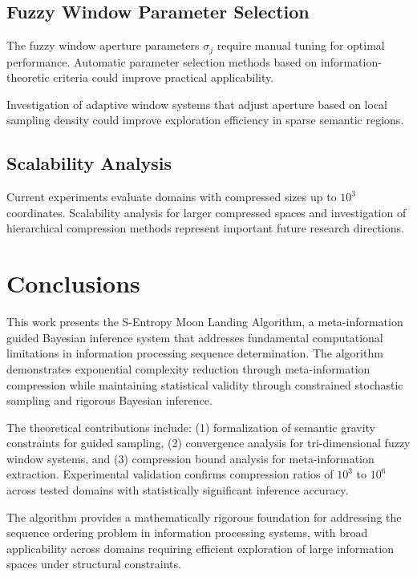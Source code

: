 \documentclass[12pt,a4paper]{article}
\begin{document}
\begin{table}[h]
\subsection{Fuzzy Window Parameter Selection}

The fuzzy window aperture parameters $\sigma_j$ require manual tuning for optimal performance. Automatic parameter selection methods based on information-theoretic criteria could improve practical applicability.

Investigation of adaptive window systems that adjust aperture based on local sampling density could improve exploration efficiency in sparse semantic regions.

\subsection{Scalability Analysis}

Current experiments evaluate domains with compressed sizes up to $10^3$ coordinates. Scalability analysis for larger compressed spaces and investigation of hierarchical compression methods represent important future research directions.

\section{Conclusions}

This work presents the S-Entropy Moon Landing Algorithm, a meta-information guided Bayesian inference system that addresses fundamental computational limitations in information processing sequence determination. The algorithm demonstrates exponential complexity reduction through meta-information compression while maintaining statistical validity through constrained stochastic sampling and rigorous Bayesian inference.

The theoretical contributions include: (1) formalization of semantic gravity constraints for guided sampling, (2) convergence analysis for tri-dimensional fuzzy window systems, and (3) compression bound analysis for meta-information extraction. Experimental validation confirms compression ratios of $10^3$ to $10^6$ across tested domains with statistically significant inference accuracy.

The algorithm provides a mathematically rigorous foundation for addressing the sequence ordering problem in information processing systems, with broad applicability across domains requiring efficient exploration of large information spaces under structural constraints.


\end{table}
\end{document}
